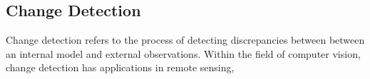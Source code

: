 \subsection{Change Detection}

Change detection refers to the process of detecting discrepancies between between an internal model and external observations. Within the field of computer vision, change detection has applications in remote sensing, 